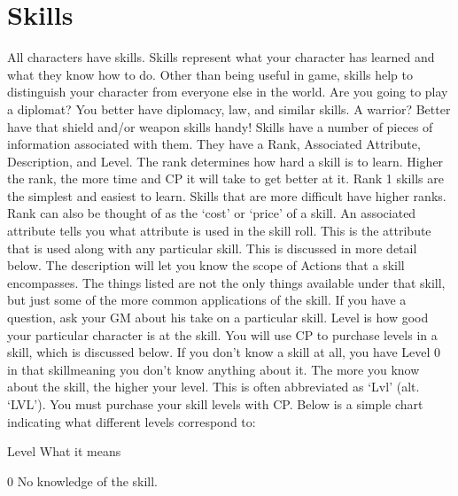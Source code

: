\documentclass[twoside]{book}
\begin{document}
\section{Skills}
     All characters have skills. Skills represent what your
             character has learned and what they know how to do. Other
             than being useful in game, skills help to distinguish your
             character from everyone else in the world. Are you going to
             play a diplomat? You better have diplomacy, law, and similar
             skills. A warrior? Better have that shield and/or weapon
             skills handy!  Skills have a number of pieces of information
             associated with them. They have a Rank, Associated
             Attribute, Description, and Level.  The rank determines how hard a skill is to learn.
             Higher the rank, the more time and CP it will take to get
             better at it. Rank 1 skills are the simplest and easiest to
             learn. Skills that are more difficult have higher ranks.
             Rank can also be thought of as the `cost' or
             `price' of a skill.  An associated attribute tells you what attribute is
             used in the skill roll. This is the attribute that is used
             along with any particular skill. This is discussed in more
             detail below.  The description will let you know the scope of Actions
             that a skill encompasses. The things listed are not the only
             things available under that skill, but just some of the more
             common applications of the skill. If you have a question,
             ask your GM about his take on a particular skill.  Level is how good your particular character is at the
             skill. You will use CP to purchase levels in a skill, which
             is discussed below. If you don't know a skill at all,
             you have Level 0 in that skillmeaning you don't
             know anything about it. The more you know about the skill,
             the higher your level. This is often abbreviated as
             `Lvl' (alt. `LVL'). You must
             purchase your skill levels with CP. Below is a simple chart
             indicating what different levels correspond to:   
              
                
                 Level   
                 What it means   
                
                
                 0   
                 No knowledge of the skill.   
                
\end{document}
